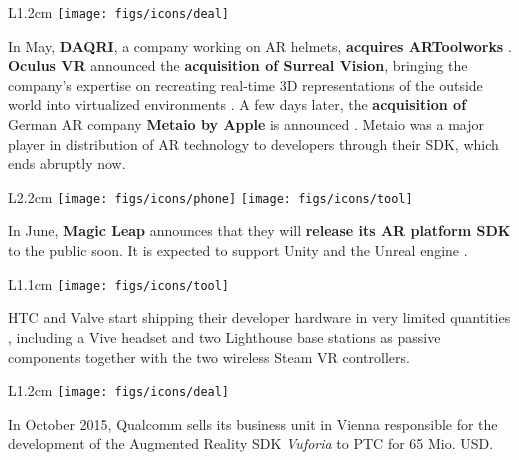 \documentclass[12pt,a4paper]{article}
\begin{document}
\vspace{0.1in}

\begin{wrapfigure}{L}{1.2cm}
	\vspace{-10pt}	
	\texttt{[image: figs/icons/deal]}
	\vspace{-20pt}		
\end{wrapfigure} 
\noindent In May, \textbf{DAQRI}, a company working on AR helmets, \textbf{acquires ARToolworks} . \textbf{Oculus VR} announced the \textbf{acquisition of Surreal Vision}, bringing the company’s expertise on recreating real-time 3D representations of the outside world into virtualized environments . A few days later, the \textbf{acquisition of} German AR company \textbf{Metaio by Apple} is announced . Metaio was a major player in distribution of AR technology to developers through their SDK, which ends abruptly now. 

\vspace{0.1in}

\begin{wrapfigure}{L}{2.2cm}
	\vspace{-15pt}	
	\texttt{[image: figs/icons/phone]}
	\texttt{[image: figs/icons/tool]}
	\vspace{-20pt}		
\end{wrapfigure} 
\noindent In June, \textbf{Magic Leap} announces that they will \textbf{release its AR platform SDK} to the public soon. It is expected to support Unity and the Unreal engine .

\vspace{0.1in}

\begin{wrapfigure}{L}{1.1cm}
	\vspace{-10pt}	
	\texttt{[image: figs/icons/tool]}
	\vspace{-15pt}		
\end{wrapfigure}
\noindent HTC and Valve start shipping their developer hardware in very limited quantities , including a Vive headset and two Lighthouse base stations as passive components together with the two wireless  Steam VR controllers.

\vspace{0.3in}

\begin{wrapfigure}{L}{1.2cm}
	\vspace{5pt}	
	\texttt{[image: figs/icons/deal]}
	\vspace{-20pt}		
\end{wrapfigure} 
\noindent In October 2015, Qualcomm sells its business unit in Vienna responsible for the development of the Augmented Reality SDK \emph{Vuforia} to PTC  for 65 Mio. USD. 
\end{document}
